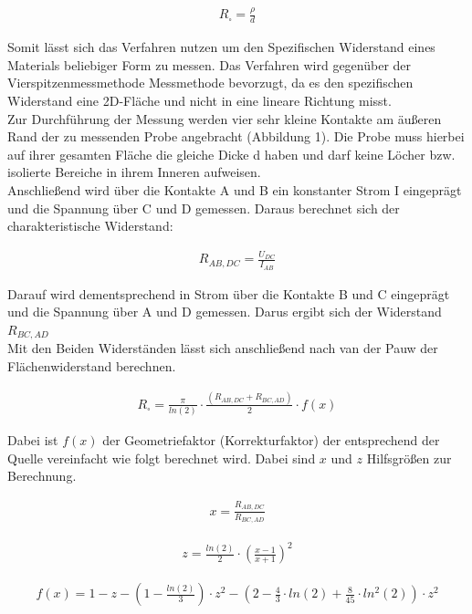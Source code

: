 \documentclass[a4paper]{scrartcl}
\numberwithin{equation}{subsection}
\begin{document}
\begin{align}
R_{\square} = \frac{\rho}{d}
\end{align}

Somit lässt sich das Verfahren nutzen um den Spezifischen Widerstand eines Materials beliebiger Form zu messen. \cite{anl}
Das Verfahren wird gegenüber der Vierspitzenmessmethode Messmethode bevorzugt, da es den spezifischen Widerstand eine 2D-Fläche und nicht in eine lineare Richtung misst. \cite{phyglob} \\

Zur Durchführung der Messung werden vier sehr kleine Kontakte am äußeren Rand der zu messenden Probe angebracht (Abbildung 1). Die Probe muss hierbei auf ihrer gesamten Fläche die gleiche Dicke d haben und darf keine Löcher bzw. isolierte Bereiche in ihrem Inneren aufweisen. \cite{anl} \\

Anschließend wird über die Kontakte A und B ein konstanter Strom I eingeprägt und die Spannung über C und D gemessen. Daraus berechnet sich der charakteristische Widerstand: \cite{phyglob}

\begin{align}
R_{AB,DC} = \frac{U_{DC}}{I_{AB}}
\end{align}

Darauf wird dementsprechend in Strom über die Kontakte B und C eingeprägt und die Spannung über A und D gemessen. Darus ergibt sich der Widerstand $R_{BC,AD}$ \cite{anl} \\

Mit den Beiden Widerständen lässt sich anschließend nach van der Pauw der Flächenwiderstand berechnen. \cite{anl}

\begin{align}
R_{\square} = \frac{\pi}{ln(2)} \cdot \frac{(R_{AB,DC}+R_{BC,AD})}{2} \cdot f(x)
\end{align}

Dabei ist $f(x)$ der Geometriefaktor (Korrekturfaktor) der entsprechend der Quelle \cite{anl} vereinfacht wie folgt berechnet wird. Dabei sind $x$ und $z$ Hilfsgrößen zur Berechnung.

\begin{align}
x = \frac{R_{AB,DC}}{R_{BC,AD}}
\end{align}

\begin{align}
z = \frac{ln(2)}{2} \cdot \left(\frac{x-1}{x+1}\right)^2
\end{align}

\begin{align}
f(x) = 1 - z - \left( 1-\frac{ln(2)}{3}\right)  \cdot z^2 - \left( 2 - \frac{4}{3} \cdot ln(2) + \frac{8}{45} \cdot ln^2(2)\right) \cdot z^2
\end{align}
\end{document}
